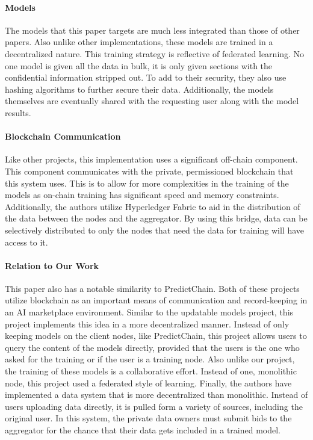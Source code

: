 \documentclass{article}
\begin{document}
    \paragraph{Models}
    The models that this paper targets are much less integrated than those of other papers.  Also unlike other implementations,
    these models are trained in a decentralized nature.  This training strategy is reflective of federated learning.  No
    one model is given all the data in bulk, it is only given sections with the confidential information stripped out.
    To add to their security, they also use hashing algorithms to further secure their data.  Additionally, the models
    themselves are eventually shared with the requesting user along with the model results.

    \paragraph{Blockchain Communication}
    Like other projects, this implementation uses a significant off-chain component.  This component communicates
    with the private, permissioned blockchain that this system uses.  This is to allow for more complexities
    in the training of the models as on-chain training has significant speed and memory constraints.  Additionally,
    the authors utilize Hyperledger Fabric to aid in the distribution of the data between the nodes and the aggregator.
    By using this bridge, data can be selectively distributed to only the nodes that need the data for training will
    have access to it.

    \paragraph{Relation to Our Work}
    This paper also has a notable similarity to PredictChain.  Both of these projects utilize blockchain as an important
    means of communication and record-keeping in an AI marketplace environment.  Similar to the updatable models
    project, this project implements this idea in a more decentralized manner.  Instead of only keeping models on the
    client nodes, like PredictChain, this project allows users to query the content of the models directly, provided that
    the users is the one who asked for the training or if the user is a training node.  Also unlike our project,
    the training of these models is a collaborative effort.  Instead of one, monolithic node, this project used
    a federated style of learning.  Finally, the authors have implemented a data system that is more decentralized than
    monolithic.  Instead of users uploading data directly, it is pulled form a variety of sources, including the original
    user.  In this system, the private data owners must submit bids to the aggregator for the chance that their data
    gets included in a trained model.
\end{document}

